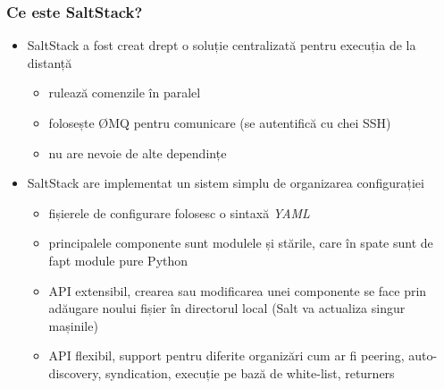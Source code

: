 \documentclass[compress]{beamer}
\begin{document}
\begin{frame}
\frametitle{Ce este SaltStack?}

\begin{itemize}[<+->]
  \item SaltStack a fost creat drept o soluție centralizată pentru execuția de la distanță
    \begin{itemize}[<+->]
      \item rulează comenzile în paralel
      \item folosește ØMQ pentru comunicare (se autentifică cu chei SSH)
      \item nu are nevoie de alte dependințe
    \end{itemize}
  \item SaltStack are implementat un sistem simplu de organizarea configurației
    \begin{itemize}[<+->]
      \item fișierele de configurare folosesc o sintaxă \emph{YAML}
      \item principalele componente sunt modulele și stările, care în spate sunt de fapt module pure Python
      \item API extensibil, crearea sau modificarea unei componente se face prin adăugare noului fișier în directorul local (Salt va actualiza singur mașinile)
      \item API flexibil, support pentru diferite organizări cum ar fi peering, auto-discovery, syndication, execuție pe bază de white-list, returners
    \end{itemize}
\end{itemize}
\end{frame}
\end{document}
